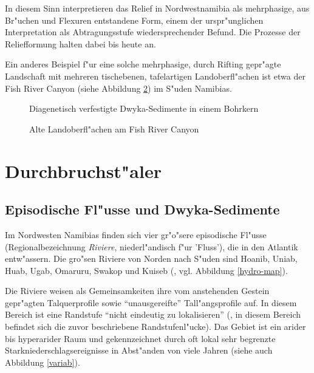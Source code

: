 \documentclass[titlepage,a4paper]{scrartcl}
\begin{document}
In diesem Sinn interpretieren \cite{BrunotteAndSpoenemann1997} das Relief in Nordwestnamibia als mehrphasige, aus Br"uchen und Flexuren entstandene Form, einem der urspr"unglichen Interpretation als Abtragungsstufe wiedersprechender Befund. Die Prozesse der Reliefformung halten dabei bis heute an.

Ein anderes Beispiel f"ur eine solche mehrphasige, durch Rifting gepr"agte Landschaft mit mehreren tischebenen, tafelartigen Landoberfl"achen ist etwa der Fish River Canyon (siehe Abbildung \ref{canyon}) im S"uden Namibias.

\begin{figure}
\begin{center}
\end{center}
\caption[Diagenetisch verfestigte Dwyka-Sedimente in einem Bohrkern]{Diagenetisch verfestigte Dwyka-Sedimente in einem Bohrkern }
\label{tillite}
\end{figure}

\begin{figure}
\begin{center}
\end{center}
\caption[Fish River Canyon: alte Landoberfl"achen]{Alte Landoberfl"achen am Fish River Canyon }
\label{canyon}
\end{figure}

\section{Durchbruchst"aler}

\subsection{Episodische Fl"usse und Dwyka-Sedimente}

Im Nordwesten Namibias finden sich vier gr"o"sere episodische Fl"usse (Regionalbezeichnung \emph{Riviere}, niederl"andisch f"ur 'Fluss'), die in den Atlantik entw"assern. Die gro"sen Riviere von Norden nach S"uden sind Hoanib, Uniab, Huab, Ugab, Omaruru, Swakop und Kuiseb (\citealt{Hueser1989}, vgl. Abbildung \ref{hydro-map}).

Die Riviere weisen als Gemeinsamkeiten ihre vom anstehenden Gestein gepr"agten Talquerprofile sowie ``unausgereifte'' \citep{HueserEtAl2003} Tall"angsprofile auf. In diesem Bereich ist eine Randstufe ``nicht eindeutig zu lokalisieren'' (\citealt[8]{HueserEtAl2003}, in diesem Bereich befindet sich die zuvor beschriebene Randstufenl"ucke). Das Gebiet ist ein arider bis hyperarider Raum und gekennzeichnet durch oft lokal sehr begrenzte Starkniederschlagsereignisse in Abst"anden von viele Jahren (siehe auch Abbildung \ref{variab}).
\end{document}
